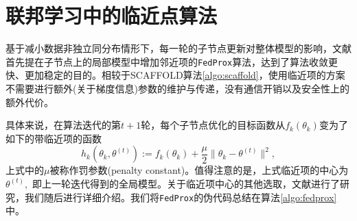 \section{联邦学习中的临近点算法}
\label{sec:chap2-ppa}

基于减小数据非独立同分布情形下，每一轮的子节点更新对整体模型的影响，文献\parencite{sahu2018fedprox}首先提在子节点上的局部模型中增加邻近项的\texttt{FedProx}算法，达到了算法收敛更快、更加稳定的目的。相较于SCAFFOLD算法\ref{algo:scaffold}，使用临近项的方案不需要进行额外(关于梯度信息)参数的维护与传递，没有通信开销以及安全性上的额外代价。

具体来说，在算法迭代的第$t+1$轮，每个子节点优化的目标函数从$f_k(\theta_k)$变为了如下的带临近项的函数
\begin{equation}
\label{eq:fedprox}
h_k(\theta_k, \theta^{(t)}) := f_k(\theta_k) + \frac{\mu}{2} \lVert \theta_k - \theta^{(t)} \rVert^2,
\end{equation}
上式中的$\mu$被称作罚参数(penalty constant)。值得注意的是，上式临近项的中心为$\theta^{(t)},$ 即上一轮迭代得到的全局模型。关于临近项中心的其他选取，文献\parencite{hanzely2020federated,li_2021_ditto}进行了研究，我们随后进行详细介绍。我们将\texttt{FedProx}的伪代码总结在算法\ref{algo:fedprox}中。



